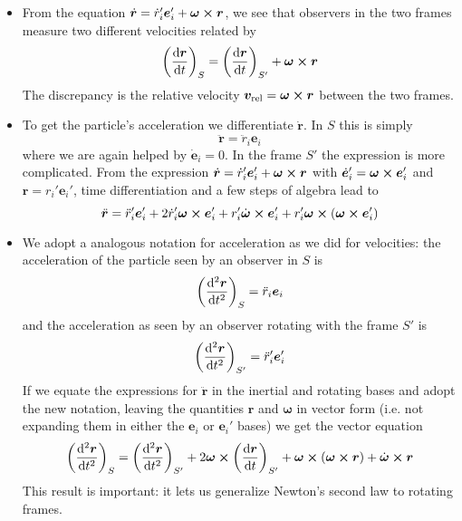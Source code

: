 \documentclass[11pt, a4paper]{article}
\newcommand{\e}{\bm{e}} %
\newcommand{\bdot}[1]{\dot{\bm{#1}}}
\newcommand{\bddot}[1]{\ddot{\bm{#1}}}
\begin{document}
\begin{itemize}
	\item From the equation $ \bdot{r} = \dot{r}_{i}'\e_{i}' + \bm{\omega} \cross \bm{r} $, we see that observers in the two frames measure two different velocities related by 
	\begin{equation*}
		\left(\dv{\bm{r}}{t}\right)_{S} = \left(\dv{\bm{r}}{t}\right)_{S'} + \bm{\omega} \cross \bm{r}
	\end{equation*}
	The discrepancy is the relative velocity $ \bm{v}_{\text{rel}} = \bm{\omega} \cross \bm{r} $ between the two frames.
	
	\item To get the particle's acceleration we differentiate $ \bdot{r} $. In $ S $ this is simply
	\begin{equation*}
		\bddot{r} = \ddot{r}_{i} \e_{i}
	\end{equation*}
	where we are again helped by $ \dot{\e}_{i} = 0$. In the frame $ S' $ the expression is more complicated. From the expression $ \bdot{r} = \dot{r}_{i}'\e_{i}' + \bm{\omega} \cross \bm{r} $ with $ \dot{\e}_{i}' = \bm{\omega} \cross \e_{i}' $ and $ \bm{r} = r_{i}' \e_{i}' $, time differentiation and a few steps of algebra lead to
	\begin{equation*}
		\bddot{r} = \ddot{r}_{i}'\e_{i}' + 2 \dot{r}_{i}' \bm{\omega} \cross \e_{i}' + r_{i}'\bdot{\omega} \cross \e_{i}' + r_{i}'\bm{\omega} \cross (\bm{\omega} \cross \e_{i}')
	\end{equation*}
		
	\item We adopt a analogous notation for acceleration as we did for velocities: the acceleration of the particle seen by an observer in $ S $ is
	\begin{equation*}
		\left(\dv[2]{\bm{r}}{t}\right)_{S} = \ddot{r}_{i}\e_{i}
	\end{equation*}
	and the acceleration as seen by an observer rotating with the frame $ S' $ is
	\begin{equation*}
		\left(\dv[2]{\bm{r}}{t}\right)_{S'} = \ddot{r}_{i}'\e_{i}'
	\end{equation*}
	If we equate the expressions for $ \bddot{r} $ in the inertial and rotating bases and adopt the new notation, leaving the quantities $ \bm{r} $ and $ \bm{\omega} $ in vector form (i.e. not expanding them in either the $ \e_{i} $ or $ \e_{i}' $ bases) we get the vector equation
	\begin{equation*}
		\left(\dv[2]{\bm{r}}{t}\right)_{S} = \left(\dv[2]{\bm{r}}{t}\right)_{S'} + 2 \bm{\omega} \cross  \left(\dv{\bm{r}}{t}\right)_{S'} + \bm{\omega} \cross (\bm{\omega} \cross \bm{r}) + \bdot{\omega} \cross \bm{r} 
	\end{equation*}
	This result is important: it lets us generalize Newton's second law to rotating frames.
\end{itemize}
\end{document}
